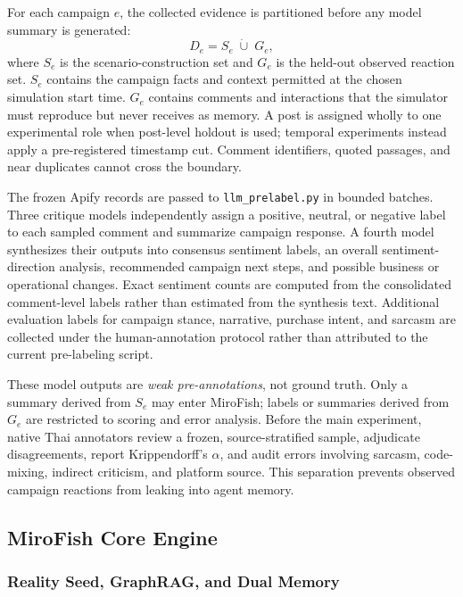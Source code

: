 \documentclass[conference]{IEEEtran}
\begin{document}
For each campaign $e$, the collected evidence is partitioned before any model
summary is generated:
\begin{equation}
    D_e = S_e \;\dot\cup\; G_e,
\end{equation}
where $S_e$ is the scenario-construction set and $G_e$ is the held-out observed
reaction set. $S_e$ contains the campaign facts and context permitted at the
chosen simulation start time. $G_e$ contains comments and interactions that
the simulator must reproduce but never receives as memory. A post is assigned
wholly to one experimental role when post-level holdout is used; temporal
experiments instead apply a pre-registered timestamp cut. Comment identifiers,
quoted passages, and near duplicates cannot cross the boundary.

The frozen Apify records are passed to \texttt{llm\_prelabel.py} in bounded
batches. Three critique models independently assign a positive, neutral, or
negative label to each sampled comment and summarize campaign response. A
fourth model synthesizes their outputs into consensus sentiment labels, an
overall sentiment-direction analysis, recommended campaign next steps, and
possible business or operational changes. Exact sentiment counts are computed
from the consolidated comment-level labels rather than estimated from the
synthesis text. Additional evaluation labels for campaign stance, narrative,
purchase intent, and sarcasm are collected under the human-annotation protocol
rather than attributed to the current pre-labeling script.

These model outputs are \emph{weak pre-annotations}, not ground truth. Only a
summary derived from $S_e$ may enter MiroFish; labels or summaries derived from
$G_e$ are restricted to scoring and error analysis. Before the main experiment,
native Thai annotators review a frozen, source-stratified sample, adjudicate
disagreements, report Krippendorff's $\alpha$, and audit errors involving
sarcasm, code-mixing, indirect criticism, and platform source. This separation
prevents observed campaign reactions from leaking into agent memory.

\subsection{MiroFish Core Engine}

\subsubsection{Reality Seed, GraphRAG, and Dual Memory}
\end{document}
